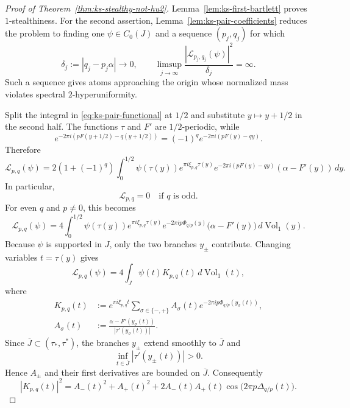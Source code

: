 \documentclass[11pt,reqno,a4paper]{amsart}
\numberwithin{equation}{section}
\theoremstyle{compact}
\theoremstyle{definition}
\theoremstyle{definition}
\newcommand{\Vol}{\operatorname{Vol}}
\begin{document}
\begin{proof}[Proof of Theorem~\ref{thm:ks-stealthy-not-hu2}]
Lemma~\ref{lem:ks-first-bartlett} proves $1$-stealthiness.  For the second
assertion, Lemma~\ref{lem:ks-pair-coefficients} reduces the problem to
finding one $\psi\in C_0(J)$ and a sequence $(p_j,q_j)$ for which
\begin{equation}\label{eq:ks-target-small-frequency-atoms}
  \delta_j:=|q_j-p_j\alpha|\longrightarrow0,
  \qquad
  \limsup_{j\to\infty}
  \frac{|\mathcal L_{p_j,q_j}(\psi)|^2}{\delta_j}=\infty.
\end{equation}
Such a sequence gives atoms approaching the origin whose normalized mass
violates spectral $2$-hyperuniformity.

Split the integral in \eqref{eq:ks-pair-functional} at $1/2$ and substitute
$y\mapsto y+1/2$ in the second half.  The functions $\tau$ and $F'$ are
$1/2$-periodic, while
\[
 e^{-2\pi i(pF(y+1/2)-q(y+1/2))}
 =(-1)^q e^{-2\pi i(pF(y)-qy)}.
\]
Therefore
\[
  \mathcal L_{p,q}(\psi)
  =2(1+(-1)^q)\int_0^{1/2}
       \psi(\tau(y))e^{\pi i\xi_{p,q}\tau(y)}
       e^{-2\pi i(pF(y)-qy)}
       (\alpha-F'(y))\,dy.
\]
In particular,
\begin{equation}\label{eq:ks-parity}
  \mathcal L_{p,q}=0\quad\text{if $q$ is odd}.
\end{equation}
For even $q$ and $p\neq0$, this becomes
\begin{equation}\label{eq:ks-half-period-functional}
  \mathcal L_{p,q}(\psi)
  =4\int_0^{1/2}
       \psi(\tau(y))e^{\pi i\xi_{p,q}\tau(y)}
       e^{-2\pi ip\Phi_{q/p}(y)}
       \bigl(\alpha-F'(y)\bigr)\,d\Vol_1(y).
\end{equation}
Because $\psi$ is supported in $J$, only the two branches $y_\pm$ contribute.
Changing variables $t=\tau(y)$ gives
\begin{equation}\label{eq:ks-functional-kernel}
  \mathcal L_{p,q}(\psi)
  =4\int_J \psi(t)K_{p,q}(t)\,d\Vol_1(t),
\end{equation}
where
\begin{align}
  K_{p,q}(t)
  &:=e^{\pi i\xi_{p,q}t}
      \sum_{\sigma\in\{-,+\}}
        A_\sigma(t)
        e^{-2\pi ip\Phi_{q/p}(y_\sigma(t))},
  \label{eq:ks-kernel-definition}\\
  A_\sigma(t)
  &:=\frac{\alpha-F'(y_\sigma(t))}
             {|\tau'(y_\sigma(t))|}.
  \label{eq:ks-kernel-amplitudes}
\end{align}
Since $\overline J\subset(\tau_*,\tau^*)$, the branches $y_\pm$ extend
smoothly to $\overline J$ and
\[
  \inf_{t\in\overline J}|\tau'(y_\pm(t))|>0.
\]
Hence $A_\pm$ and their first derivatives are bounded on $\overline J$.
Consequently
\begin{equation}\label{eq:ks-kernel-square}
  |K_{p,q}(t)|^2
  =A_-(t)^2+A_+(t)^2
   +2A_-(t)A_+(t)
      \cos\bigl(2\pi p\Delta_{q/p}(t)\bigr).
\end{equation}


\end{proof}
\end{document}
